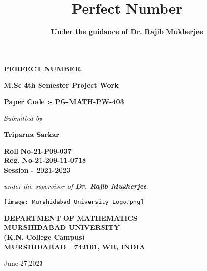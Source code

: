 \documentclass[12pt,,a4paper]{book}
\title{\textbf{Perfect Number}}
\author{\textbf{Under the guidance of Dr. Rajib Mukherjee }}
\begin{document}
\onecolumn

\thispagestyle{empty}

\begin{center}

\textbf{\fontsize{28}{\baselineskip}\selectfont\color{blue} PERFECT NUMBER}

\vspace*{1.2cm}

\textbf{\fontsize{22}{\baselineskip}\selectfont M.Sc 4th Semester Project Work}

\bigskip

\textbf{\fontsize{16}{\baselineskip}\selectfont Paper Code :- PG-MATH-PW-403}

\bigskip


\textit{\fontsize{18}{\baselineskip}\selectfont Submitted  by}


\bigskip

\textbf{\fontsize{24}{\baselineskip}\selectfont\color{magenta} Triparna Sarkar } 


\bigskip

\textbf{\large{Roll No-21-P09-037\vspace*{0.5cm}\\Reg. No-21-209-11-0718\vspace*{0.5cm}\\ Session - 2021-2023}}


\bigskip
\textit{\fontsize{17}{\baselineskip}\selectfont under the supervisor of \color{red}\textbf{Dr. Rajib Mukherjee } }
\vspace*{0.5cm}
\begin{center}
    
\texttt{[image: Murshidabad\_University\_Logo.png]}
\end{center}
\vspace*{0.5cm}
\textbf{\fontsize{14}{\baselineskip}\selectfont DEPARTMENT OF MATHEMATICS\vspace*{0.5cm}\\\color{blue} MURSHIDABAD UNIVERSITY\vspace*{0.5cm}\\\color{darkgray} (K.N. College Campus)\\\vspace*{0.5cm}\color{black}\small MURSHIDABAD - 742101, WB, INDIA\\ \vspace*{0.2cm}}

June 27,2023
\end{center}
\end{document}
